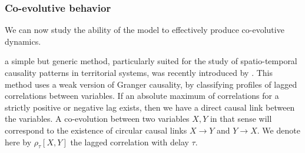 \subsubsection{Co-evolutive behavior}





We can now study the ability of the model to effectively produce co-evolutive dynamics. 

 a simple but generic method, particularly suited for the study of spatio-temporal causality patterns in territorial systems,  was recently introduced by \cite{raimbault2017identification}. This method uses a weak version of Granger causality, by classifying profiles of lagged correlations between variables. If an absolute maximum of correlations for a strictly positive or negative lag exists, then we have a direct causal link between the variables. A co-evolution between two variables $X,Y$ in that sense will correspond to the existence of circular causal links $X\rightarrow Y$ and $Y\rightarrow X$. We denote here by $\rho_{\tau}\left[X,Y\right]$ the lagged correlation with delay $\tau$.


